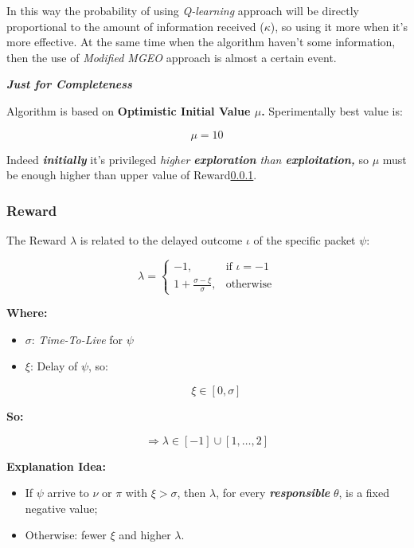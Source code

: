 \documentclass[12pt]{article}
\begin{document}
In this way the probability of using \textit{Q-learning} approach will be directly proportional to the amount of information received ($\kappa$), so using it more when it's more effective. At the same time when the algorithm haven't some information, then the use of \textit{Modified MGEO} approach is almost a certain event.

\textit{\textbf{Just for Completeness}}

Algorithm is based on \textbf{Optimistic Initial Value $\mu$.} Sperimentally best value is:

\[
    \mu = 10 
\]

Indeed \textit{\textbf{initially}} it's privileged \textit{higher \textbf{exploration} than \textbf{exploitation,}} so $\mu$ must be enough higher than upper value of Reward\ref{subsubsection:Reward}.

\subsubsection{Reward}
\label{subsubsection:Reward}

The Reward $\lambda$ is related to the delayed outcome $\iota$ of the specific packet $\psi$:

\[
    \lambda= 
    \begin{cases}
        -1,& \text{if } \iota = -1\\
        1 + \frac{\sigma - \xi}{\sigma}, & \text{otherwise}
    \end{cases}
\]

\textbf{Where:}

\begin{itemize}

    \item $\sigma$: \textit{Time-To-Live} for $\psi$

    \item $\xi$: Delay of $\psi$, so:
    
    \[
        \xi \in [0, \sigma]
    \]
    
\end{itemize}

\textbf{So:}

\[
    \Rightarrow\lambda \in [ -1] \cup [1, \dots, 2 ]
\]

\textbf{Explanation Idea:} 

\begin{itemize}

    \item If $\psi$ arrive to $\nu$  or $\pi$ with $\xi > \sigma$, then $\lambda$, for every \textit{\textbf{responsible}} $\theta$, is a fixed negative value;

    \item Otherwise: fewer $\xi$ and higher $\lambda$.
    
\end{itemize}
\end{document}
